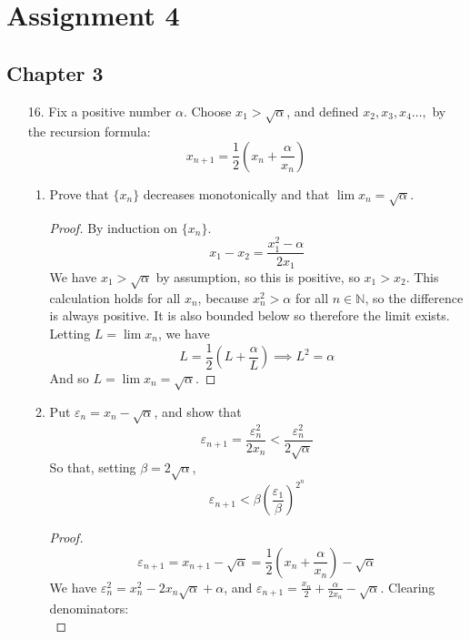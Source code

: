 \documentclass[hidelinks,12pt]{article}
\title{\scalebox{1.5}{Math 723 Homework 4}}
\author{\scalebox{1.5}{Theo Koss}}
\date{October 2024}
\newcommand{\N}{\mathbb{N}}
\begin{document}
\maketitle
\section*{Assignment 4}
\subsection*{Chapter 3}
\begin{enumerate}
    \item[16.] Fix a positive number \(\alpha\). Choose \(x_{1}>\sqrt{\alpha}\), and defined \(x_{2},x_{3},x_{4}\dots,\) by the recursion formula: \[
    x_{n+1}=\frac{1}{2}\left(x_{n}+\frac{\alpha}{x_{n}}\right)
    \]
    \begin{enumerate}[label=(\alph*).]
        \item Prove that \(\{x_{n}\}\) decreases monotonically and that \(\lim x_{n}=\sqrt{\alpha}\).
            \begin{proof}
                By induction on \(\{x_{n}\}\).
                \[
                    x_{1}-x_{2}=\frac{x_{1}^{2}-\alpha}{2x_{1}}
                \]
                We have \(x_{1}>\sqrt{\alpha}\) by assumption, so this is positive, so \(x_{1}>x_{2}\). This calculation holds for all \(x_{n}\), because \(x_{n}^{2}>\alpha\) for all \(n\in\N\), so the difference is always positive. It is also bounded below so therefore the limit exists. Letting \(L=\lim x_{n}\), we have \[
                L=\frac{1}{2}\left(L+\frac{\alpha}{L}\right)\implies L^{2}=\alpha
                \]
                And so \(L=\lim x_{n}=\sqrt{\alpha}\).
            \end{proof}
        \item Put \(\varepsilon_{n}=x_{n}-\sqrt{\alpha}\), and show that \[
                \varepsilon_{n+1}=\frac{\varepsilon_{n}^{2}}{2x_{n}}<\frac{\varepsilon_{n}^{2}}{2\sqrt{\alpha}}
        \]
        So that, setting \(\beta=2\sqrt{\alpha}\), \[
        \varepsilon_{n+1}<\beta\left(\frac{\varepsilon_{1}}{\beta}\right)^{2^{n}}
        \]
        \begin{proof}
            \[
                \varepsilon_{n+1}=x_{n+1}-\sqrt{\alpha}=\frac{1}{2}\left(x_{n}+\frac{\alpha}{x_{n}}\right)-\sqrt{\alpha}
            \]
            We have \(\varepsilon_{n}^{2}=x^{2}_{n}-2x_{n}\sqrt{\alpha}+\alpha\), and \(\varepsilon_{n+1}=\frac{x_{n}}{2}+\frac{\alpha}{2x_{n}}-\sqrt{\alpha}\). Clearing denominators: \[
\]
\end{proof}
\end{enumerate}
\end{enumerate}
\end{document}
